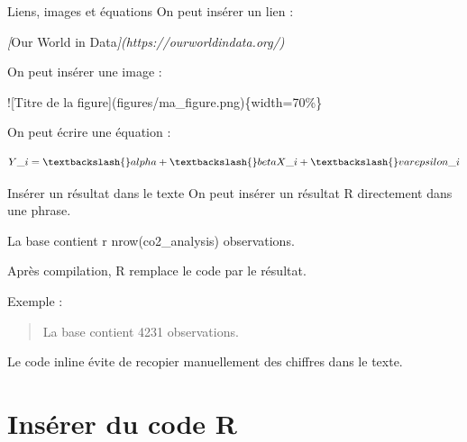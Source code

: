 \documentclass[
  10pt,
  ignorenonframetext,
]{beamer}
\newenvironment{Shaded}{\begin{snugshade}}{\end{snugshade}}
\newcommand{\AlertTok}[1]{\textcolor[rgb]{0.94,0.16,0.16}{#1}}
\newcommand{\CommentTok}[1]{\textcolor[rgb]{0.56,0.35,0.01}{\textit{#1}}}
\newcommand{\NormalTok}[1]{#1}
\newcommand{\OtherTok}[1]{\textcolor[rgb]{0.56,0.35,0.01}{#1}}
\begin{document}
\begin{frame}[fragile]{Liens, images et équations}
\label{liens-images-et-uxe9quations}
On peut insérer un lien :

\begin{Shaded}
\begin{Highlighting}[]
\CommentTok{[}\OtherTok{Our World in Data}\CommentTok{](https://ourworldindata.org/)}
\end{Highlighting}
\end{Shaded}

On peut insérer une image :

\begin{Shaded}
\begin{Highlighting}[]
\AlertTok{![Titre de la figure](figures/ma\_figure.png)}\NormalTok{\{width=70\%\}}
\end{Highlighting}
\end{Shaded}

On peut écrire une équation :

\begin{Shaded}
\begin{Highlighting}[]
\NormalTok{$$}
\NormalTok{Y\_i = \textbackslash{}alpha + \textbackslash{}beta X\_i + \textbackslash{}varepsilon\_i}
\NormalTok{$$}
\end{Highlighting}
\end{Shaded}
\end{frame}

\begin{frame}{Insérer un résultat dans le texte}
\label{insuxe9rer-un-ruxe9sultat-dans-le-texte}
On peut insérer un résultat R directement dans une phrase.

La base contient r nrow(co2\_analysis) observations.

Après compilation, R remplace le code par le résultat.

Exemple :

\begin{quote}
La base contient 4231 observations.
\end{quote}

Le code inline évite de recopier manuellement des chiffres dans le
texte.
\end{frame}

\section{Insérer du code R}\label{insuxe9rer-du-code-r}
\end{document}
